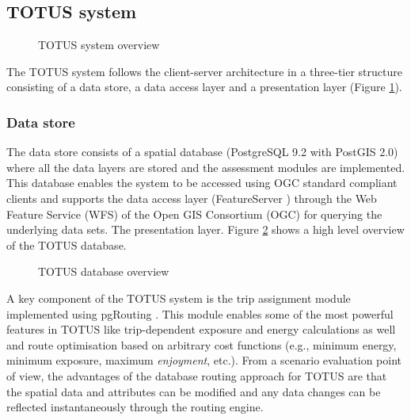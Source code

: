 
\subsection*{TOTUS system}

\begin{figure}
	\caption{TOTUS system overview}
	\label{fig:system_diag}
\end{figure}

The TOTUS system follows the client-server architecture in a 
three-tier structure consisting of a data store, a data access layer and a presentation layer (Figure \ref{fig:system_diag}).

\subsubsection*{Data store}
The data store consists of a spatial database (PostgreSQL 9.2\cite{pgsql} 
with PostGIS 2.0\cite{postgis}) where all the data layers are stored and the
assessment modules are implemented. This database enables the system to be accessed using OGC standard compliant clients and supports the data access layer (FeatureServer\cite{dummy_temp} ) through the Web Feature Service (WFS) of the Open GIS
Consortium (OGC) for querying the underlying data sets. The presentation layer. Figure \ref{fig:db_diag} shows a high level overview of the TOTUS database.

\begin{figure}
	\caption{TOTUS database overview}
	\label{fig:db_diag}
\end{figure}


A key component of the TOTUS system is the trip assignment module implemented using pgRouting\cite{dummy_temp} . This module enables some of the most powerful features in TOTUS like trip-dependent exposure and energy calculations as well and route optimisation based on arbitrary cost functions (e.g., minimum energy, minimum exposure, maximum \textit{enjoyment}, etc.). From a scenario evaluation point of view, the advantages of the database routing approach for TOTUS are that the spatial data and attributes can be modified and any data changes can be reflected instantaneously through the
routing engine.

